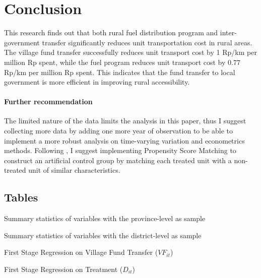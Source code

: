 \documentclass[letterpaper,12pt,leqno]{article}
\newcommand{\bib}{bibliography.bib}
\begin{document}
\section{Conclusion}\label{s:conclusion}

This research finds out that both rural fuel distribution program and inter-government transfer significantly reduces unit transportation cost in rural areas. The village fund transfer successfully reduces unit transport cost by 1 Rp/km per million Rp spent, while the fuel program reduces unit transport cost by 0.77 Rp/km per million Rp spent. This indicates that the fund transfer to local government is more efficient in improving rural accessibility.

\paragraph{Further recommendation}
The limited nature of the data limits the analysis in this paper, thus I suggest collecting more data by adding one more year of observation to be able to implement a more robust analysis on time-varying variation and econometrics methods. Following \citet{abadie2016}, I suggest implementing Propensity Score Matching to construct an artificial control group by matching each treated unit with a non-treated unit of similar characteristics.


\newpage

\begin{landscape}
\appendix
\section{Tables}\label{a:table}
\begin{table}[H]
\caption{Summary statistics of variables with the province-level as sample} 
\scalebox{0.8}{}
\label{t:1}\end{table}

\begin{table}[H]
\caption{Summary statistics of variables with the district-level as sample} 
\scalebox{0.8}{}
\label{t:2}\end{table}


\begin{table}[H]
\caption{First Stage Regression on Village Fund Transfer ($VF_{it}$)}
\scalebox{0.8}{}    
\label{t:FSVF}\end{table}


\begin{table}[H]
\caption{First Stage Regression on Treatment ($D_{it}$)}
\scalebox{0.8}{}    
\label{t:FSD}\end{table}
\end{landscape}
\end{document}
